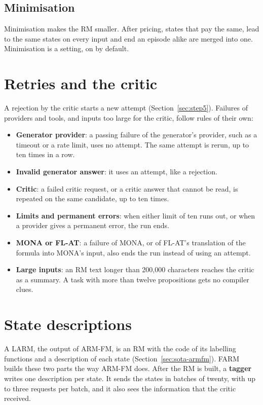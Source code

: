 \documentclass[11pt,english,listoffigures,listoftables]{tfgetsinf}
\begin{document}
\subsection{Minimisation}
Minimisation makes the RM smaller. After pricing, states that pay the same, lead to the same states on every input and end an episode alike are merged into one. Minimisation is a setting, on by default.

\section{Retries and the critic}
A rejection by the critic starts a new attempt (Section~\ref{sec:step5}). Failures of providers and tools, and inputs too large for the critic, follow rules of their own:
\begin{itemize}
    \item \textbf{Generator provider}: a passing failure of the generator's provider, such as a timeout or a rate limit, uses no attempt. The same attempt is rerun, up to ten times in a row.
    \item \textbf{Invalid generator answer}: it uses an attempt, like a rejection.
    \item \textbf{Critic}: a failed critic request, or a critic answer that cannot be read, is repeated on the same candidate, up to ten times.
    \item \textbf{Limits and permanent errors}: when either limit of ten runs out, or when a provider gives a permanent error, the run ends.
    \item \textbf{MONA or FL-AT}: a failure of MONA, or of FL-AT's translation of the formula into MONA's input, also ends the run instead of using an attempt.
    \item \textbf{Large inputs}: an RM text longer than 200{,}000 characters reaches the critic as a summary. A task with more than twelve propositions gets no compiler clues.
\end{itemize}

\section{State descriptions}
A LARM, the output of ARM-FM, is an RM with the code of its labelling functions and a description of each state (Section~\ref{sec:sota-armfm}). FARM builds these two parts the way ARM-FM does. After the RM is built, a \textbf{tagger} writes one description per state. It sends the states in batches of twenty, with up to three requests per batch, and it also sees the information that the critic received.
\end{document}

